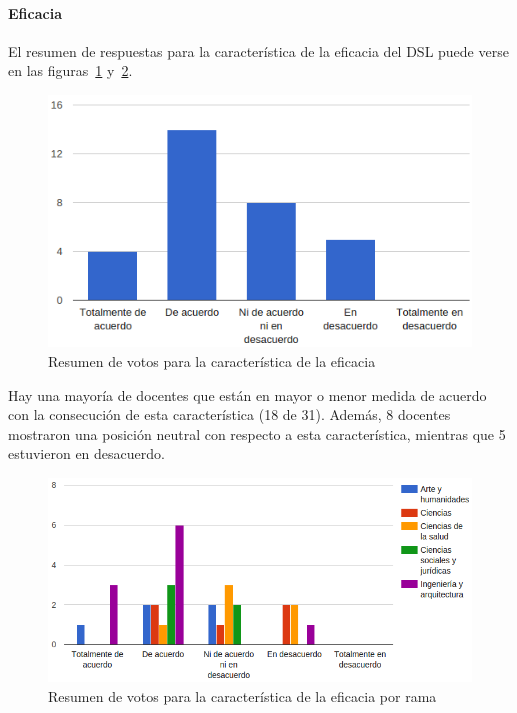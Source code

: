 \newpage
\paragraph*{Eficacia}

El resumen de respuestas para la característica de la eficacia del DSL puede verse en las figuras~\ref{fig:evalmetodo:dsl:eficacia} y~\ref{fig:evalmetodo:dsl:eficacia:rama}.

\begin{figure}[h]
  \begin{center}
    \includegraphics[scale=0.5]{C_DSL_eficacia.png}
  \end{center}
  \caption{Resumen de votos para la característica de la eficacia}
  \label{fig:evalmetodo:dsl:eficacia}
\end{figure}

Hay una mayoría de docentes que están en mayor o menor medida de acuerdo con la consecución de esta característica (18 de 31). Además, 8 docentes mostraron una posición neutral con respecto a esta característica, mientras que 5 estuvieron en desacuerdo. %

\begin{figure}[h]
  \begin{center}
    \includegraphics[scale=0.5]{C_DSL_eficacia_rama.png}
  \end{center}
  \caption{Resumen de votos para la característica de la eficacia por rama}
  \label{fig:evalmetodo:dsl:eficacia:rama}
\end{figure}

